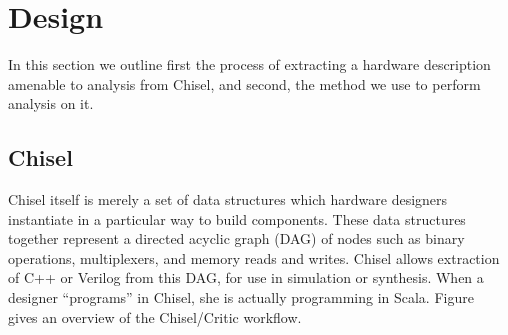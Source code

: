 \documentclass[10pt,conference]{IEEEtran}
\begin{document}
\section{Design}

In this section we outline first the process of extracting a hardware description
amenable to analysis from Chisel, and second, the method we use to perform analysis
on it.

\subsection{Chisel}
Chisel itself is merely a set of data structures which hardware designers
instantiate in a particular way to build components. These data structures
together represent a directed acyclic graph (DAG) of nodes such as binary operations,
multiplexers, and
memory reads and writes. Chisel allows extraction
of C++ or Verilog from this DAG, for use in simulation or synthesis. 
When a designer ``programs'' in Chisel, she is actually programming in Scala.
Figure~\cite{fig:overview} gives an overview of the Chisel/Critic workflow.
\end{document}
